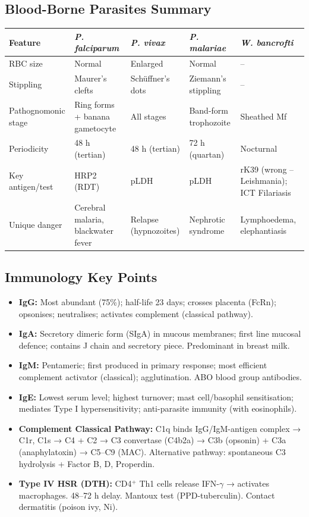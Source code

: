 \documentclass[11pt,a4paper]{article}
\begin{document}
\subsection{Blood-Borne Parasites Summary}

\begin{center}
\begin{tabular}{lllll}
\toprule
\textbf{Feature} & \textbf{\textit{P. falciparum}} & \textbf{\textit{P. vivax}} & \textbf{\textit{P. malariae}} & \textbf{\textit{W. bancrofti}} \\
\midrule
RBC size & Normal & Enlarged & Normal & -- \\
Stippling & Maurer's clefts & Schüffner's dots & Ziemann's stippling & -- \\
Pathognomonic stage & Ring forms + banana gametocyte & All stages & Band-form trophozoite & Sheathed Mf \\
Periodicity & 48 h (tertian) & 48 h (tertian) & 72 h (quartan) & Nocturnal \\
Key antigen/test & HRP2 (RDT) & pLDH & pLDH & rK39 (wrong -- Leishmania); ICT Filariasis \\
Unique danger & Cerebral malaria, blackwater fever & Relapse (hypnozoites) & Nephrotic syndrome & Lymphoedema, elephantiasis \\
\bottomrule
\end{tabular}
\end{center}

\subsection{Immunology Key Points}
\begin{itemize}[leftmargin=*]
    \item \textbf{IgG:} Most abundant (75\%); half-life 23 days; crosses placenta (FcRn); opsonises; neutralises; activates complement (classical pathway).
    \item \textbf{IgA:} Secretory dimeric form (SIgA) in mucous membranes; first line mucosal defence; contains J chain and secretory piece. Predominant in breast milk.
    \item \textbf{IgM:} Pentameric; first produced in primary response; most efficient complement activator (classical); agglutination. ABO blood group antibodies.
    \item \textbf{IgE:} Lowest serum level; highest turnover; mast cell/basophil sensitisation; mediates Type I hypersensitivity; anti-parasite immunity (with eosinophils).
    \item \textbf{Complement Classical Pathway:} C1q binds IgG/IgM-antigen complex → C1r, C1s → C4 + C2 → C3 convertase (C4b2a) → C3b (opsonin) + C3a (anaphylatoxin) → C5--C9 (MAC). Alternative pathway: spontaneous C3 hydrolysis + Factor B, D, Properdin.
    \item \textbf{Type IV HSR (DTH):} CD4$^+$ Th1 cells release IFN-$\gamma$ → activates macrophages. 48--72 h delay. Mantoux test (PPD-tuberculin). Contact dermatitis (poison ivy, Ni).
\end{itemize}
\end{document}
